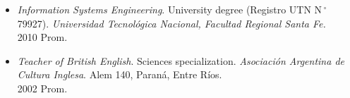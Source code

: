 \begin{itemize}
    \item \textit{Information Systems Engineering}. University degree (Registro UTN N$\,^\circ$ 79927). \textit{Universidad Tecnológica Nacional, Facultad Regional Santa Fe.} \\
    2010 Prom.
    \item \textit{Teacher of British English}. Sciences specialization. \textit{Asociación Argentina de Cultura Inglesa}. Alem 140, Paraná, Entre Ríos. \\
    2002 Prom.
\end{itemize}